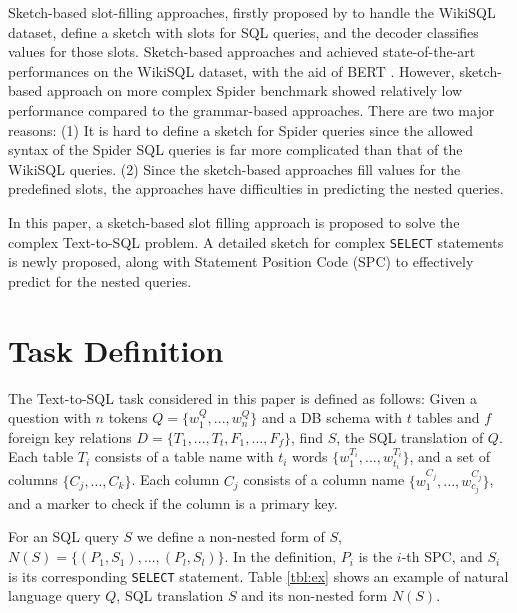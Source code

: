 \documentclass[11pt,a4paper]{article}
\begin{document}
Sketch-based slot-filling approaches, firstly proposed by \citet{sqlnet} to handle the WikiSQL dataset, define a sketch with slots for SQL queries, and the decoder classifies values for those slots. Sketch-based approaches \citet{sqlova} and \citet{xsql} achieved state-of-the-art performances on the WikiSQL dataset, with the aid of BERT \citep{Devlin:19}. However, sketch-based approach on more complex Spider benchmark \citep{rcsql} showed relatively low performance compared to the grammar-based approaches. There are two major reasons: (1) It is hard to define a sketch for Spider queries since the allowed syntax of the Spider SQL queries is far more complicated than that of the WikiSQL queries. (2) Since the sketch-based approaches fill values for the predefined slots, the approaches have difficulties in predicting the nested queries.

In this paper, a sketch-based slot filling approach is proposed to solve the complex Text-to-SQL problem. A detailed sketch for complex \texttt{SELECT} statements is newly proposed, along with Statement Position Code (SPC) to effectively predict for the nested queries.

\section{Task Definition}
\label{sec:task}
The Text-to-SQL task considered in this paper is defined as follows: Given a question with $n$ tokens $Q = \{w^Q_1, ..., w^Q_n\}$ and a DB schema with $t$ tables and $f$ foreign key relations $D=\{T_1, ...,T_t, F_1, ..., F_f\}$, find $S$, the SQL translation of $Q$. Each table $T_i$ consists of a table name with $t_i$ words $\{w^{T_i}_1, ..., w^{T_i}_{t_i}\}$, and a set of columns $\{C_j, ..., C_k\}$. Each column $C_j$ consists of a column name $\{w^{C_j}_1, ..., w^{C_j}_{c_j}\}$, and a marker to check if the column is a primary key.  

For an SQL query $S$ we define a non-nested form of $S$, $N(S)=\{(P_1, S_1), ..., (P_l, S_l)\}$. In the definition, $P_i$ is the $i$-th SPC, and $S_i$ is its corresponding \texttt{SELECT} statement. Table \ref{tbl:ex} shows an example of natural language query $Q$, SQL translation $S$ and its non-nested form $N(S)$.
\end{document}
